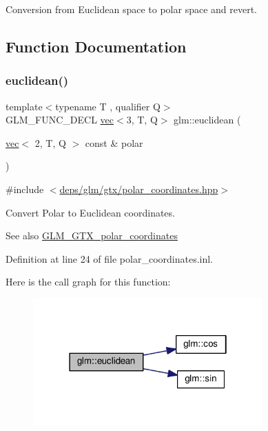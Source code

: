 Conversion from Euclidean space to polar space and revert. 

\subsection{Function Documentation}
\mbox{\label{group__gtx__polar__coordinates_ga1821d5b3324201e60a9e2823d0b5d0c8}} 
\subsubsection{\texorpdfstring{euclidean()}{euclidean()}}
{\footnotesize\ttfamily template$<$typename T , qualifier Q$>$ \\
G\+L\+M\+\_\+\+F\+U\+N\+C\+\_\+\+D\+E\+CL \hyperlink{structglm_1_1vec}{vec}$<$3, T, Q$>$ glm\+::euclidean (\begin{DoxyParamCaption}\item[{\hyperlink{structglm_1_1vec}{vec}$<$ 2, T, Q $>$ const \&}]{polar }\end{DoxyParamCaption})}



{\ttfamily \#include $<$\hyperlink{polar__coordinates_8hpp}{deps/glm/gtx/polar\+\_\+coordinates.\+hpp}$>$}

Convert Polar to Euclidean coordinates.

\begin{DoxySeeAlso}{See also}
\hyperlink{group__gtx__polar__coordinates}{G\+L\+M\+\_\+\+G\+T\+X\+\_\+polar\+\_\+coordinates} 
\end{DoxySeeAlso}


Definition at line 24 of file polar\+\_\+coordinates.\+inl.

Here is the call graph for this function\+:
\nopagebreak
\begin{figure}[H]
\begin{center}
\leavevmode
\includegraphics[width=250pt]{d4/d30/group__gtx__polar__coordinates_ga1821d5b3324201e60a9e2823d0b5d0c8_cgraph}
\end{center}
\end{figure}
\mbox{\label{group__gtx__polar__coordinates_gab83ac2c0e55b684b06b6c46c28b1590d}} 

